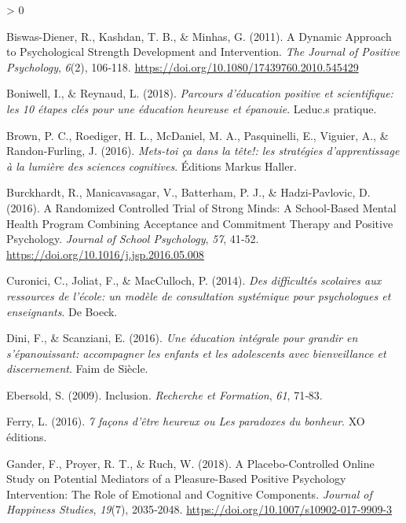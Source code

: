 \documentclass[
  french,
]{article}
\newlength{\cslhangindent}
\newenvironment{CSLReferences}[2] %
 {%
  \setlength{\parindent}{0pt}
  \ifodd #1 \everypar{\setlength{\hangindent}{\cslhangindent}}\ignorespaces\fi
  \ifnum #2 > 0
  \setlength{\parskip}{#2\baselineskip}
  \fi
 }%
 {}
\begin{document}
\hypertarget{refs}{}
\begin{CSLReferences}{1}{0}
\leavevmode\hypertarget{ref-biswas-diener2011}{}%
Biswas-Diener, R., Kashdan, T. B., \& Minhas, G. (2011). A Dynamic Approach to Psychological Strength Development and Intervention. \emph{The Journal of Positive Psychology}, \emph{6}(2), 106‑118. \url{https://doi.org/10.1080/17439760.2010.545429}

\leavevmode\hypertarget{ref-boniwell2018}{}%
Boniwell, I., \& Reynaud, L. (2018). \emph{{Parcours d'éducation positive et scientifique: les 10 étapes clés pour une éducation heureuse et épanouie}}. {Leduc.s pratique}.

\leavevmode\hypertarget{ref-brown2016}{}%
Brown, P. C., Roediger, H. L., McDaniel, M. A., Pasquinelli, E., Viguier, A., \& Randon-Furling, J. (2016). \emph{{Mets-toi ça dans la tête!: les stratégies d'apprentissage à la lumière des sciences cognitives}}. {Éditions Markus Haller}.

\leavevmode\hypertarget{ref-burckhardt2016}{}%
Burckhardt, R., Manicavasagar, V., Batterham, P. J., \& Hadzi-Pavlovic, D. (2016). A Randomized Controlled Trial of Strong Minds: {A} School-Based Mental Health Program Combining Acceptance and Commitment Therapy and Positive Psychology. \emph{Journal of School Psychology}, \emph{57}, 41‑52. \url{https://doi.org/10.1016/j.jsp.2016.05.008}

\leavevmode\hypertarget{ref-curonici2014}{}%
Curonici, C., Joliat, F., \& MacCulloch, P. (2014). \emph{{Des difficultés scolaires aux ressources de l'école: un modèle de consultation systémique pour psychologues et enseignants}}. {De Boeck}.

\leavevmode\hypertarget{ref-dini2016}{}%
Dini, F., \& Scanziani, E. (2016). \emph{{Une éducation intégrale pour grandir en s'épanouissant: accompagner les enfants et les adolescents avec bienveillance et discernement}}. {Faim de Siècle}.

\leavevmode\hypertarget{ref-ebersold2009}{}%
Ebersold, S. (2009).{} {Inclusion}{}. \emph{Recherche et Formation}, \emph{61}, 71‑83.

\leavevmode\hypertarget{ref-ferry2016a}{}%
Ferry, L. (2016). \emph{{7 façons d'être heureux ou Les paradoxes du bonheur}}. {XO éditions}.

\leavevmode\hypertarget{ref-gander2018}{}%
Gander, F., Proyer, R. T., \& Ruch, W. (2018). A {Placebo}-{Controlled Online Study} on {Potential Mediators} of a {Pleasure}-{Based Positive Psychology Intervention}: {The Role} of {Emotional} and {Cognitive Components}. \emph{Journal of Happiness Studies}, \emph{19}(7), 2035‑2048. \url{https://doi.org/10.1007/s10902-017-9909-3}


\end{CSLReferences}
\end{document}
